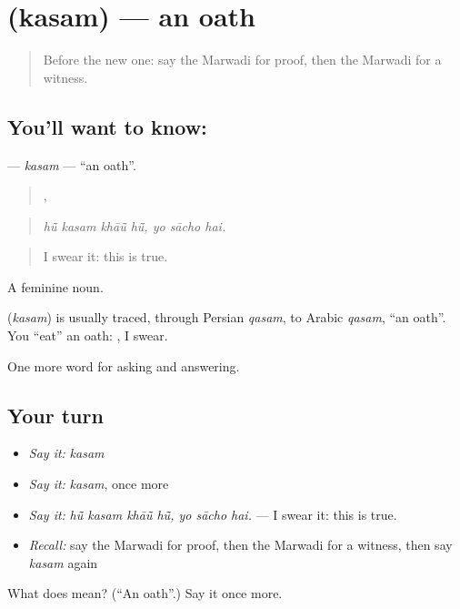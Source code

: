 \section[\texorpdfstring{\mw{कसम} (kasam)}{कसम (kasam)}]{ (kasam) — an oath}

\label{lesson:MW-C271-kasam}



\begin{quote}
Before the new one: say the Marwadi for proof, then the Marwadi for a witness.
\end{quote}

\subsection*{You'll want to know: }
\textbf{} — \emph{kasam} — \textquotedblleft{}an oath\textquotedblright{}.

\begin{quote}
   ,   
\end{quote}

\begin{quote}
\emph{hū̃ kasam khāū̃ hū̃, yo sācho hai.}
\end{quote}

\begin{quote}
I swear it: this is true.
\end{quote}

A feminine noun.

\begin{cousinweb}
\textbf{} (\emph{kasam}) is usually traced, through Persian \emph{qasam}, to Arabic \emph{qasam}, \textquotedblleft{}an oath\textquotedblright{}. You \textquotedblleft{}eat\textquotedblright{} an oath: \textbf{  }, I swear.
\end{cousinweb}

\begin{grammarlens}[title={What you've built}]
One more word for asking and answering.
\end{grammarlens}

\subsection*{Your turn}
\begin{itemize}
\raggedright
  \item \emph{Say it:} \emph{kasam}
  \item \emph{Say it:} \emph{kasam}, once more
  \item \emph{Say it:} \emph{hū̃ kasam khāū̃ hū̃, yo sācho hai.} — I swear it: this is true.
  \item \emph{Recall:} say the Marwadi for proof, then the Marwadi for a witness, then say \emph{kasam} again
\end{itemize}

\begin{tcolorbox}[breakable,colback=teal!4,colframe=teal!35!black,title={Before you move on}]
What does  mean? (\textquotedblleft{}An oath\textquotedblright{}.) Say it once more.
\end{tcolorbox}
